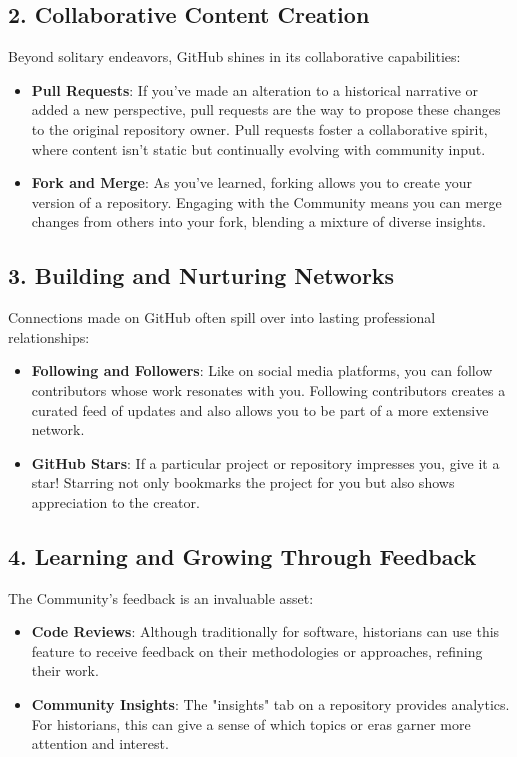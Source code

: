 \documentclass[a4paper,12pt]{book}
\begin{document}
\subsection*{2. Collaborative Content Creation}
Beyond solitary endeavors, GitHub shines in its collaborative capabilities:

\begin{itemize}
    \item \textbf{Pull Requests}: If you've made an alteration to a historical narrative or added a new perspective, pull requests are the way to propose these changes to the original repository owner. Pull requests foster a collaborative spirit, where content isn't static but continually evolving with community input.
    \item \textbf{Fork and Merge}: As you've learned, forking allows you to create your version of a repository. Engaging with the Community means you can merge changes from others into your fork, blending a mixture of diverse insights.
\end{itemize}

\subsection*{3. Building and Nurturing Networks}
Connections made on GitHub often spill over into lasting professional relationships:

\begin{itemize}
    \item \textbf{Following and Followers}: Like on social media platforms, you can follow contributors whose work resonates with you. Following contributors creates a curated feed of updates and also allows you to be part of a more extensive network.
    \item \textbf{GitHub Stars}: If a particular project or repository impresses you, give it a star! Starring not only bookmarks the project for you but also shows appreciation to the creator.
\end{itemize}

\subsection*{4. Learning and Growing Through Feedback}
The Community's feedback is an invaluable asset:

\begin{itemize}
    \item \textbf{Code Reviews}: Although traditionally for software, historians can use this feature to receive feedback on their methodologies or approaches, refining their work.
    \item \textbf{Community Insights}: The "insights" tab on a repository provides analytics. For historians, this can give a sense of which topics or eras garner more attention and interest.
\end{itemize}
\end{document}
